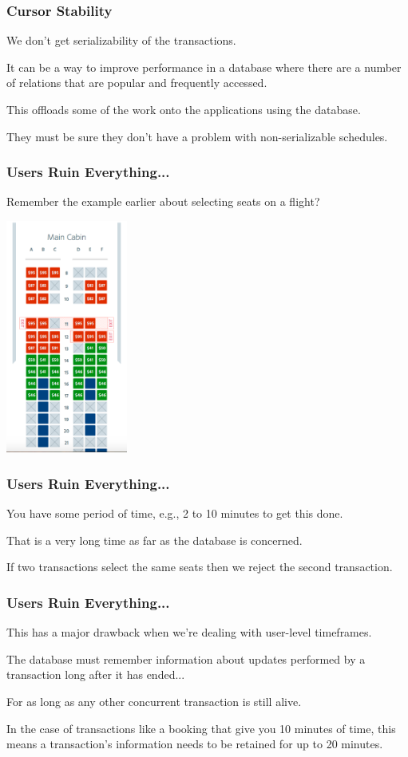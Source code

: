 \begin{frame}
\frametitle{Cursor Stability}

We don't get serializability of the transactions. 

It can be a way to improve performance in a database where there are a number of relations that are popular and frequently accessed. 

This offloads some of the work onto the applications using the database. 

They must be sure they don't have a problem with non-serializable schedules.


\end{frame}

\begin{frame}
\frametitle{Users Ruin Everything...}

Remember the example earlier about selecting seats on a flight?

\begin{center}
	\includegraphics[width=0.3\textwidth]{images/seat-selection.png}
\end{center}

\end{frame}

\begin{frame}
\frametitle{Users Ruin Everything...}
You have some period of time, e.g., 2 to 10 minutes to get this done. 

That is a very long time as far as the database is concerned. 

If two transactions select the same seats then we reject the second transaction.

\end{frame}


\begin{frame}
\frametitle{Users Ruin Everything...}

This has a major drawback when we're dealing with user-level timeframes. 

The database must remember information about updates performed by a transaction long after it has ended... 

For as long as any other concurrent transaction is still alive.

In the case of transactions like a booking that give you 10 minutes of time, this means a transaction's information needs to be retained for up to 20 minutes. 


\end{frame}

